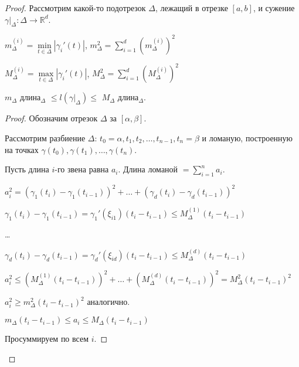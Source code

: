     \begin{proof}
    
        Рассмотрим какой-то подотрезок $\Delta$, лежащий в отрезке $[a,b]$, и сужение $\gamma|_{\Delta} \colon \Delta \rightarrow \mathbb{R}^d$.

        $m_{\Delta}^{(i)} = \min\limits_{t \in \Delta} |\gamma_i'(t)|$, $m_{\Delta}^2 = \sum\limits_{i=1}^d(m_{\Delta}^{(i)})^2$

        $M_{\Delta}^{(i)} = \max\limits_{t \in \Delta} |\gamma_i'(t)|$, $M_{\Delta}^2 = \sum\limits_{i=1}^d(M_{\Delta}^{(i)})^2$

        \begin{lemma}
        
            $m_{\Delta}$ длина$_{\Delta}$ $\le l(\gamma|_{\Delta}) \le$ $M_{\Delta}$ длина$_{\Delta}$.
        
        \end{lemma}

        \begin{proof}
        
            Обозначим отрезок $\Delta$ за $[\alpha, \beta]$.

            Рассмотрим разбиение $\Delta$: $t_0 = \alpha, t_1, t_2, \dots, t_{n-1}, t_n = \beta$ и ломаную, 
            построенную на точках $\gamma(t_0), \gamma(t_1), \dots, \gamma(t_n)$.

            Пусть длина $i$-го звена равна $a_i$.
            Длина ломаной $= \sum\limits_{i=1}^n a_i$.

            $a_i^2 = (\gamma_1(t_i) - \gamma_1(t_{i - 1}))^2 + \dots + (\gamma_d(t_i) - \gamma_d(t_{i - 1}))^2$

            $\gamma_1(t_i) - \gamma_1(t_{i - 1}) = \gamma_1'(\xi_{i1})(t_i - t_{i-1}) \le M_{\Delta}^{(1)} (t_i - t_{i-1})$

            \dots

            $\gamma_d(t_i) - \gamma_d(t_{i - 1}) = \gamma_d'(\xi_{id})(t_i - t_{i-1}) \le M_{\Delta}^{(d)} (t_i - t_{i-1})$

            $a_i^2 \le (M_{\Delta}^{(1)}(t_i - t_{i-1}))^2 + \dots + (M_{\Delta}^{(d)}(t_i - t_{i-1}))^2 = M_{\Delta}^{2}(t_i - t_{i-1})^2$

            $a_i^2 \ge m_{\Delta}^{2}(t_i - t_{i-1})^2$ аналогично.

            $m_{\Delta}(t_i-t_{i-1}) \le a_i \le M_{\Delta}(t_i-t_{i-1})$

            Просуммируем по всем $i$.


\end{proof}
\end{proof}
